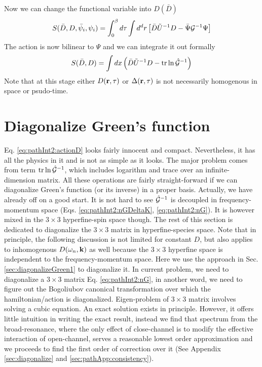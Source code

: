 Now we can change the functional variable into $D(\bar{D})$ 
\begin{equation}\label{eq:pathInt2:actionMixD}
S(\bar{D},D,\bar\psi_{i},\psi_{i})=\int^{\beta}_{0}d\tau\int{d^{d}r}
	\left[\bar{D}\tilde{U}^{-1}D-\bar\Psi\mathcal{G}^{-1}\Psi\right]
\end{equation}
The action is now bilinear to $\Psi$ and we can integrate it out formally
\begin{equation}\label{eq:pathInt2:actionD}
S(\bar{D},D)=\int{dx}\left(\bar{D}\tilde{U}^{-1}D-\text{tr}\ln\hat{\mathcal{G}}^{-1}\right)
\end{equation}
Note that at this stage either $D(\mathbf{r},\tau)$ or $\Delta(\mathbf{r},\tau)$ is not necessarily homogenous in space or psudo-time.  



\section{Diagonalize Green's function\label{sec:diagonalGreen}}
Eq. \eqref{eq:pathInt2:actionD} looks fairly innocent and compact.  Nevertheless, it has all the physics in it and is not as simple as it looks.  The major problem comes from term $\text{tr}\ln\hat{\mathcal{G}}^{-1}$, which includes  logarithm and trace over an infinite-dimension matrix.   All these operations are fairly straight-forward if we can diagonalize  Green's function (or its inverse) in a proper basis.    Actually, we have already off on a good start.  It is not hard to see $\hat{\mathcal{G}}^{-1}$ is decoupled in frequency-momentum space (Eqs.  \ref{eq:pathInt2:nGDeltaK}, \ref{eq:pathInt2:nG}).  It is however mixed in the $3\times3$ hyperfine-spin space though.  The rest of this section is dedicated to diagonalize the $3\times3$ matrix in hyperfine-species space.  Note that in principle, the following discussion is not limited for constant $D$, but also applies to inhomogenous $D(\omega_{n},\mathbf{k})$ as well because the $3\times3$ hyperfine space is independent to the frequency-momentum space.   Here we use the approach in Sec. \ref{sec:diagonalizeGreen1} to diagonalize it.   
In current problem, we need to diagonalize a $3\times3$ matrix Eq. \ref{eq:pathInt2:nG}, in another word, we need to figure out the Bogoliubov canonical transformation over which the hamiltonian/action is diagonalized.   Eigen-problem of $3\times3$ matrix involves solving a cubic equation. An exact solution exists in principle.  However,  it offers little intuition in writing the exact result, instead we  find that  spectrum from the broad-resonance, where the only effect of close-channel is to modify the effective interaction of open-channel, serves a reasonable lowest order approximation and we proceeds to find the first order of correction over it (See Appendix \ref{sec:diagonalize} and \ref{sec:pathApp:consistency}). 


